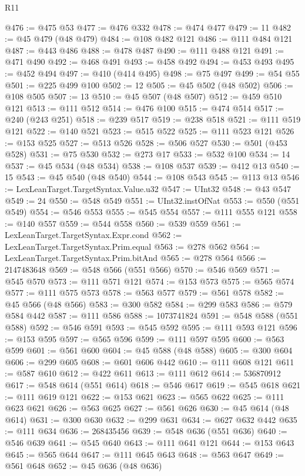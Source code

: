\begin{lexlean}{R11}
\begin{coremodule}
@476 := @475 @53
@477 := @476 @332
@478 := @474 @477
@479 := 11
@482 := @45 @479 (@48 @479)
@484 := @108 @482 @121
@486 := @111 @484 @121
@487 := @443 @486
@488 := @478 @487
@490 := @111 @488 @121
@491 := @471 @490
@492 := @468 @491
@493 := @458 @492
@494 := @453 @493
@495 := @452 @494
@497 := @410 (@414 @495)
@498 := @75 @497
@499 := @54 @55
@501 := @225 @499 @100
@502 := 12
@505 := @45 @502 (@48 @502)
@506 := @108 @505
@507 := 13
@510 := @45 @507 (@48 @507)
@512 := @459 @510 @121
@513 := @111 @512
@514 := @476 @100
@515 := @474 @514
@517 := @240 (@243 @251)
@518 := @239 @517
@519 := @238 @518
@521 := @111 @519 @121
@522 := @140 @521
@523 := @515 @522
@525 := @111 @523 @121
@526 := @153 @525
@527 := @513 @526
@528 := @506 @527
@530 := @501 (@453 @528)
@531 := @75 @530
@532 := @273 @17
@533 := @532 @100
@534 := 14
@537 := @45 @534 (@48 @534)
@538 := @108 @537
@539 := @412 @13
@540 := 15
@543 := @45 @540 (@48 @540)
@544 := @108 @543
@545 := @113 @13
@546 := LexLeanTarget.TargetSyntax.Value.u32
@547 := UInt32
@548 := @43 @547
@549 := 24
@550 := @548 @549
@551 := UInt32.instOfNat
@553 := @550 (@551 @549)
@554 := @546 @553
@555 := @545 @554
@557 := @111 @555 @121
@558 := @140 @557
@559 := @544 @558
@560 := @539 @559
@561 := LexLeanTarget.TargetSyntax.Expr.cond
@562 := LexLeanTarget.TargetSyntax.Prim.equal
@563 := @278 @562
@564 := LexLeanTarget.TargetSyntax.Prim.bitAnd
@565 := @278 @564
@566 := 2147483648
@569 := @548 @566 (@551 @566)
@570 := @546 @569
@571 := @545 @570
@573 := @111 @571 @121
@574 := @153 @573
@575 := @565 @574
@577 := @111 @575 @573
@578 := @563 @577
@579 := @561 @578
@582 := @45 @566 (@48 @566)
@583 := @300 @582
@584 := @299 @583
@586 := @579 @584 @442
@587 := @111 @586
@588 := 1073741824
@591 := @548 @588 (@551 @588)
@592 := @546 @591
@593 := @545 @592
@595 := @111 @593 @121
@596 := @153 @595
@597 := @565 @596
@599 := @111 @597 @595
@600 := @563 @599
@601 := @561 @600
@604 := @45 @588 (@48 @588)
@605 := @300 @604
@606 := @299 @605
@608 := @601 @606 @442
@610 := @111 @608 @121
@611 := @587 @610
@612 := @422 @611
@613 := @111 @612
@614 := 536870912
@617 := @548 @614 (@551 @614)
@618 := @546 @617
@619 := @545 @618
@621 := @111 @619 @121
@622 := @153 @621
@623 := @565 @622
@625 := @111 @623 @621
@626 := @563 @625
@627 := @561 @626
@630 := @45 @614 (@48 @614)
@631 := @300 @630
@632 := @299 @631
@634 := @627 @632 @442
@635 := @111 @634
@636 := 268435456
@639 := @548 @636 (@551 @636)
@640 := @546 @639
@641 := @545 @640
@643 := @111 @641 @121
@644 := @153 @643
@645 := @565 @644
@647 := @111 @645 @643
@648 := @563 @647
@649 := @561 @648
@652 := @45 @636 (@48 @636)

\end{coremodule}
\end{lexlean}
